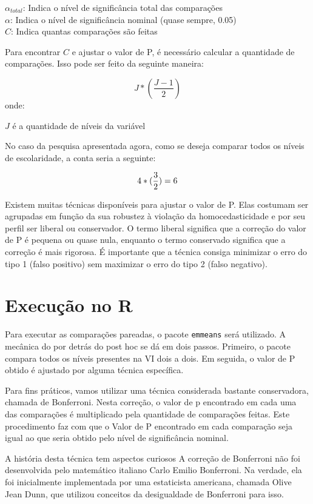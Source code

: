 \documentclass[
]{book}
\begin{document}
\(\alpha_{total}\): Indica o nível de significância total das comparações\\
\(\alpha\): Indica o nível de significância nominal (quase sempre, 0.05)\\
\(C\): Indica quantas comparações são feitas

Para encontrar \(C\) e ajustar o valor de P, é necessário calcular a quantidade de comparações. Isso pode ser feito da seguinte maneira:

\[J*(\frac{J-1}2)\]
onde:

\(J\) é a quantidade de níveis da variável

No caso da pesquisa apresentada agora, como se deseja comparar todos os níveis de escolaridade, a conta seria a seguinte:

\[4*(\frac{3}{2})\\=6\]

Existem muitas técnicas disponíveis para ajustar o valor de P. Elas costumam ser agrupadas em função da sua robustez à violação da homocedasticidade e por seu perfil ser liberal ou conservador. O termo liberal significa que a correção do valor de P é pequena ou quase nula, enquanto o termo conservado significa que a correção é mais rigorosa. É importante que a técnica consiga minimizar o erro do tipo 1 (falso positivo) sem maximizar o erro do tipo 2 (falso negativo).

\hypertarget{execuuxe7uxe3o-no-r-6}{%
\section{Execução no R}\label{execuuxe7uxe3o-no-r-6}}

Para executar as comparações pareadas, o pacote \texttt{emmeans} será utilizado. A mecânica do por detrás do post hoc se dá em dois passos. Primeiro, o pacote compara todos os níveis presentes na VI dois a dois. Em seguida, o valor de P obtido é ajustado por alguma técnica específica.

Para fins práticos, vamos utilizar uma técnica considerada bastante conservadora, chamada de Bonferroni. Nesta correção, o valor de p encontrado em cada uma das comparações é multiplicado pela quantidade de comparações feitas. Este procedimento faz com que o Valor de P encontrado em cada comparação seja igual ao que seria obtido pelo nível de significância nominal.

A história desta técnica tem aspectos curiosos A correção de Bonferroni não foi desenvolvida pelo matemático italiano Carlo Emilio Bonferroni. Na verdade, ela foi inicialmente implementada por uma estaticista americana, chamada Olive Jean Dunn, que utilizou conceitos da desigualdade de Bonferroni para isso.
\end{document}
